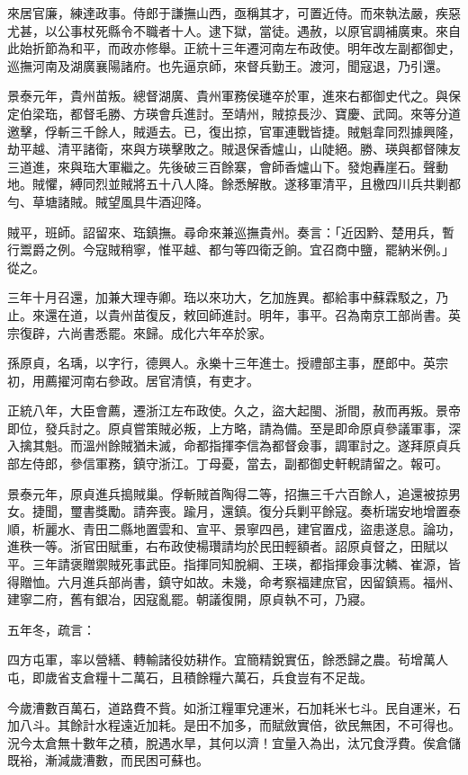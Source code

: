 \begin{pinyinscope}
來居官廉，練達政事。侍郎于謙撫山西，亟稱其才，可置近侍。而來執法嚴，疾惡尤甚，以公事杖死縣令不職者十人。逮下獄，當徒。遇赦，以原官調補廣東。來自此始折節為和平，而政亦修舉。正統十三年遷河南左布政使。明年改左副都御史，巡撫河南及湖廣襄陽諸府。也先逼京師，來督兵勤王。渡河，聞寇退，乃引還。

景泰元年，貴州苗叛。總督湖廣、貴州軍務侯璡卒於軍，進來右都御史代之。與保定伯梁珤，都督毛勝、方瑛會兵進討。至靖州，賊掠長沙、寶慶、武岡。來等分道邀擊，俘斬三千餘人，賊遁去。已，復出掠，官軍連戰皆捷。賊魁韋同烈據興隆，劫平越、清平諸衛，來與方瑛擊敗之。賊退保香爐山，山陡絕。勝、瑛與都督陳友三道進，來與珤大軍繼之。先後破三百餘寨，會師香爐山下。發炮轟崖石。聲動地。賊懼，縛同烈並賊將五十八人降。餘悉解散。遂移軍清平，且檄四川兵共剿都勻、草塘諸賊。賊望風具牛酒迎降。

賊平，班師。詔留來、珤鎮撫。尋命來兼巡撫貴州。奏言：「近因黔、楚用兵，暫行鬻爵之例。今寇賊稍寧，惟平越、都勻等四衛乏餉。宜召商中鹽，罷納米例。」從之。

三年十月召還，加兼大理寺卿。珤以來功大，乞加旌異。都給事中蘇霖駁之，乃止。來還在道，以貴州苗復反，敕回師進討。明年，事平。召為南京工部尚書。英宗復辟，六尚書悉罷。來歸。成化六年卒於家。

孫原貞，名瑀，以字行，德興人。永樂十三年進士。授禮部主事，歷郎中。英宗初，用薦擢河南右參政。居官清慎，有吏才。

正統八年，大臣會薦，遷浙江左布政使。久之，盜大起閩、浙間，赦而再叛。景帝即位，發兵討之。原貞嘗策賊必叛，上方略，請為備。至是即命原貞參議軍事，深入擒其魁。而溫州餘賊猶未滅，命都指揮李信為都督僉事，調軍討之。遂拜原貞兵部左侍郎，參信軍務，鎮守浙江。丁母憂，當去，副都御史軒輗請留之。報可。

景泰元年，原貞進兵搗賊巢。俘斬賊首陶得二等，招撫三千六百餘人，追還被掠男女。捷聞，璽書獎勵。請奔喪。踰月，還鎮。復分兵剿平餘寇。奏析瑞安地增置泰順，析麗水、青田二縣地置雲和、宣平、景寧四邑，建官置戍，盜患遂息。論功，進秩一等。浙官田賦重，右布政使楊瓚請均於民田輕額者。詔原貞督之，田賦以平。三年請褒贈禦賊死事武臣。指揮同知脫綱、王瑛，都指揮僉事沈轔、崔源，皆得贈恤。六月進兵部尚書，鎮守如故。未幾，命考察福建庶官，因留鎮焉。福州、建寧二府，舊有銀冶，因寇亂罷。朝議復開，原貞執不可，乃寢。

五年冬，疏言：

四方屯軍，率以營繕、轉輸諸役妨耕作。宜簡精銳實伍，餘悉歸之農。茍增萬人屯，即歲省支倉糧十二萬石，且積餘糧六萬石，兵食豈有不足哉。

今歲漕數百萬石，道路費不貲。如浙江糧軍兌運米，石加耗米七斗。民自運米，石加八斗。其餘計水程遠近加耗。是田不加多，而賦斂實倍，欲民無困，不可得也。況今太倉無十數年之積，脫遇水旱，其何以濟！宜量入為出，汰冗食浮費。俟倉儲既裕，漸減歲漕數，而民困可蘇也。


\end{pinyinscope}
